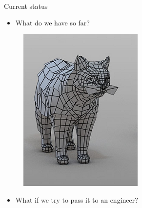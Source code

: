 \newcommand{\norm}[1]{\parallel #1 \parallel_2}

\begin{frame}{Current status}
\begin{minipage}[t]{0.4\linewidth}

\begin{itemize}
\item What do we have so far?
\end{itemize}
\vspace{5mm}
\begin{figure}
\includegraphics[width=0.8\linewidth]{Pictures/cat.png}
\end{figure}
\end{minipage}%
\pause
\begin{minipage}[t]{0.6\linewidth}
\begin{itemize}
\item What if we try to pass it to an engineer?
\end{itemize}
\begin{figure}

\end{figure}
\end{minipage}
\end{frame}
